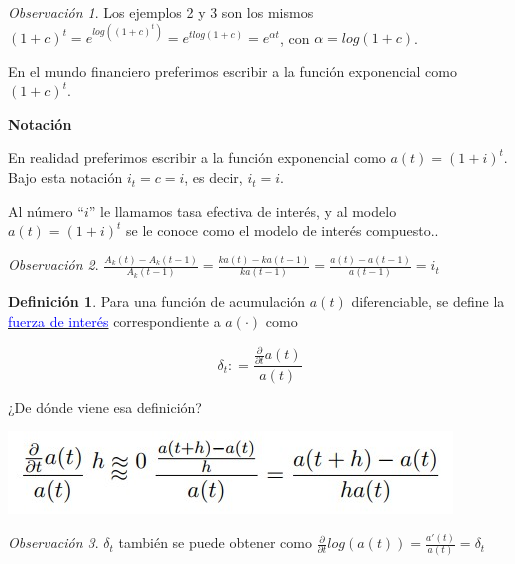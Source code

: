 \documentclass[
]{book}
\theoremstyle{definition}
\newtheorem{definition}{Definición}[chapter]
\theoremstyle{definition}
\theoremstyle{definition}
\theoremstyle{definition}
\theoremstyle{remark}
\newtheorem*{remark}{Observación }
\begin{document}
\begin{remark}
Los ejemplos 2 y 3 son los mismos
\((1+c)^t=e^{log\left((1+c)^t \right)} = e^{tlog(1+c)}=e^{\alpha t}\), con \(\alpha = log(1+c)\).

En el mundo financiero preferimos escribir a la función exponencial como \((1+c)^t\).
\end{remark}

\textbf{{Notación}}

En realidad preferimos escribir a la función exponencial como \(a(t) = (1+i)^t\). Bajo esta notación \(i_t = c = i\), es decir, \(i_t=i\).

Al número ``\(i\)'' le llamamos {tasa efectiva de interés}, y al modelo \(a(t)=(1+i)^t\) se le conoce como el {modelo de interés compuesto.}.

\begin{remark}
\(\frac{A_k(t)-A_k(t-1)}{A_k(t-1)}=\frac{ka(t) - ka(t-1)}{ka(t-1)} = \frac{a(t)-a(t-1)}{a(t-1)} = i_t\)
\end{remark}

\begin{definition}
Para una función de acumulación \(a(t)\) diferenciable, se define la \underline{\textcolor{blue}{fuerza de interés}} correspondiente a \(a(\cdot)\) como
\end{definition}

\begin{equation*}
\boxed{
\delta_t : = \frac{\frac{\partial}{\partial t} a(t)}{a(t)}
}\end{equation*}

¿De dónde viene esa definición?

\includegraphics{images/2.jpg}

\begin{remark}
\(\delta_t\) también se puede obtener como \(\frac{\partial}{\partial t} log(a(t)) = \frac{a'(t)}{a(t)} = \delta_t\)
\end{remark}
\end{document}
